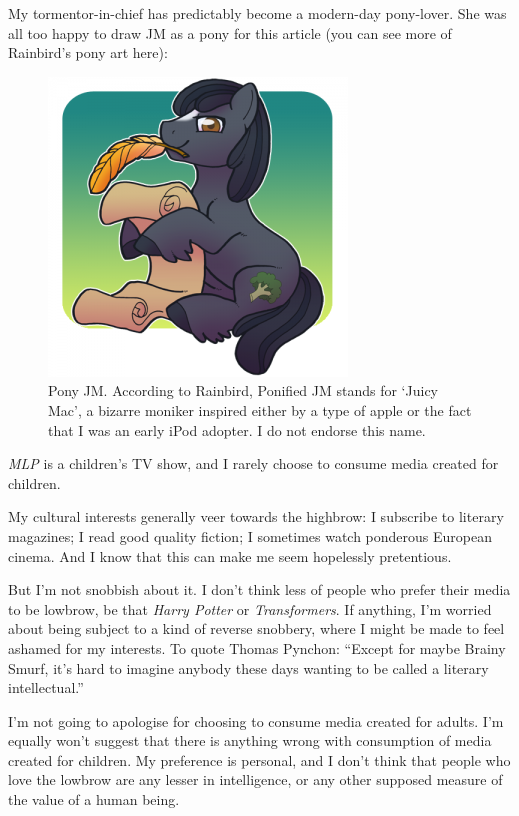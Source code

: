 My tormentor-in-chief has predictably become a modern-day pony-lover. She was all too happy to draw JM as a pony for this article (you can see more of Rainbird’s pony art here):

\begin{figure}
  \begin{center}
    \includegraphics{content/assets/mlp--ponified-jm}
  \end{center}
  \caption{Pony JM. According to Rainbird, Ponified JM stands for ‘Juicy Mac’, a bizarre moniker inspired either by a type of apple or the fact that I was an early iPod adopter. I do not endorse this name.}
\end{figure}

\textit{MLP} is a children’s TV show, and I rarely choose to consume media created for children.

My cultural interests generally veer towards the highbrow: I subscribe to literary magazines; I read good quality fiction; I sometimes watch ponderous European cinema. And I know that this can make me seem hopelessly pretentious.

But I’m not snobbish about it. I don’t think less of people who prefer their media to be lowbrow, be that \textit{Harry Potter} or \textit{Transformers}. If anything, I’m worried about being subject to a kind of reverse snobbery, where I might be made to feel ashamed for my interests. To quote Thomas Pynchon: ``Except for maybe Brainy Smurf, it’s hard to imagine anybody these days wanting to be called a literary intellectual.''

I’m not going to apologise for choosing to consume media created for adults. I’m equally won’t suggest that there is anything wrong with consumption of media created for children. My preference is personal, and I don’t think that people who love the lowbrow are any lesser in intelligence, or any other supposed measure of the value of a human being.


